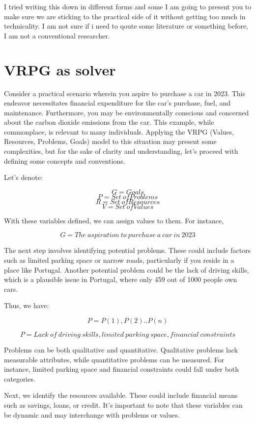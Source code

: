 \documentclass{article}
\begin{document}
I tried writing this down in different forms and some I am going to present you to make sure we are sticking to the practical side of it without getting too much in technicality. I am not sure if i need to qoute some literature or something before, I am not a conventional researcher. 

\section{VRPG as solver}

Consider a practical scenario wherein you aspire to purchase a car in 2023. This endeavor necessitates financial expenditure for the car's purchase, fuel, and maintenance. Furthermore, you may be environmentally conscious and concerned about the carbon dioxide emissions from the car. This example, while commonplace, is relevant to many individuals. Applying the VRPG (Values, Resources, Problems, Goals) model to this situation may present some complexities, but for the sake of clarity and understanding, let's proceed with defining some concepts and conventions.

Let's denote:

	\[ 
	G= Goals 
	\]
	\[ 
	P = Set \ of Problems 
	\]
	\[ 
	R = Set \ of Resources 
	\]
	\[ 
	V = Set \ of Values 
	\]

With these variables defined, we can assign values to them. For instance, 

	\[ 
	G= The \ aspiration \ to  \ purchase  \ a  \ car \ in \ 2023 
	\]

The next step involves identifying potential problems. These could include factors such as limited parking space or narrow roads, particularly if you reside in a place like Portugal. Another potential problem could be the lack of driving skills, which is a plausible issue in Portugal, where only 459 out of 1000 people own cars.

Thus, we have:

	\[ 
	P= {P(1), P(2)..P(n)} 
	\]
	
	\[ 
	P= Lack \ of \ driving \ skills, limited \ parking \ space , financial \ constraints
	\]

Problems can be both qualitative and quantitative. Qualitative problems lack measurable attributes, while quantitative problems can be measured. For instance, limited parking space and financial constraints could fall under both categories.

Next, we identify the resources available. These could include financial means such as savings, loans, or credit. It's important to note that these variables can be dynamic and may interchange with problems or values.
\end{document}

